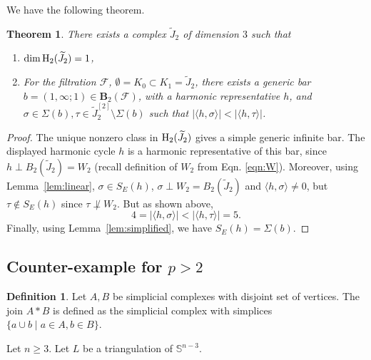 \documentclass[11pt]{amsart}
\theoremstyle{theorem}
\newtheorem{theorem}{Theorem}
\theoremstyle{remark}
\theoremstyle{definition}
\newtheorem{definition}{Definition}[section]
\newcommand {\la}   {{\langle}}
\newcommand {\ra}   {{\rangle}}
\newcommand{\HH}  {\mbox{\rm H}}
\newcommand{\FF}{\mathcal{F}}
\begin{document}
We have the following theorem.
\begin{theorem}\label{thm:base_case}
    There exists a complex $\widetilde{J}_2$ of dimension $3$ such that
    \begin{enumerate}[label=(\alph*)]
        \item $\dim \HH_2(\widetilde{J}_2) = 1$,
        \item For the filtration $\FF$, $\emptyset = K_0  \subset K_1 = \widetilde{J}_2$, there exists a generic bar $b=(1,\infty;1) \in \mathbf{B}_2(\FF)$, with a harmonic representative $h$, and $\sigma \in \Sigma(b), \tau \in \widetilde{J}_2^{[2]} \setminus \Sigma(b)$ 
        such that $|\langle h, \sigma \rangle| < |\langle h,\tau \rangle|$.
    \end{enumerate}
\end{theorem}
\begin{proof}
The unique nonzero
class in \(\HH_2(\widetilde{J}_2)\) gives a simple generic infinite bar. The
displayed harmonic cycle $h$ is a harmonic representative of this bar, since
$h \perp B_2(\widetilde{J}_2) =  W_2$ (recall definition of $W_2$ from Eqn. \eqref{eqn:W}).
Moreover, using Lemma~\ref{lem:linear},
$\sigma \in S_E(h)$, $\sigma \perp W_2 = B_2(\widetilde{J}_2)$ and $\la h, \sigma\ra \neq 0$, but $\tau \not\in S_E(h)$ since $\tau \not\perp W_2$.
But as shown above, 
\[
4 = |\langle h, \sigma \rangle| < |\langle h,\tau \rangle| = 5.
\]
Finally, using Lemma~\ref{lem:simplified}, we have $S_E(h) = \Sigma(b)$.
\end{proof}


\subsection{Counter-example for $p> 2$}
\label{subsec:counter:p}
\begin{definition}
    Let $A, B$ be simplicial complexes with disjoint set of vertices. The join $A*B$ is defined as the simplicial complex with simplices $\{a\cup b \mid a\in A, b\in B\}$. 
\end{definition}
Let $n\geq 3$. Let $L$ be a triangulation of $\mathbb{S}^{n-3}$. 
\end{document}
